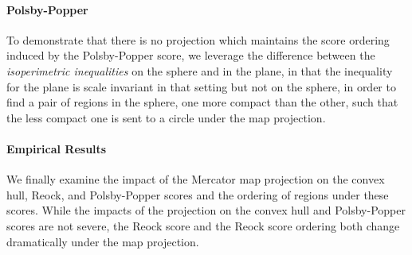 \paragraph{Polsby-Popper}
To demonstrate that there is no projection which maintains the score ordering induced by the Polsby-Popper score,  we leverage the 
difference between the \textit{isoperimetric inequalities} on the sphere and in the plane, in that the inequality for the plane is scale invariant in that setting but not on the sphere, in order to find a pair of regions in the sphere, one more compact than the other, such that the less compact one is sent to a circle under the map projection.

\paragraph{Empirical Results}
We finally examine the impact of the Mercator map projection on the convex hull, Reock, and Polsby-Popper 
scores and the ordering of regions under these scores.  While the impacts of the projection on the convex hull and 
 Polsby-Popper scores are not severe, the Reock score and the Reock score ordering both change dramatically 
 under the map projection.




